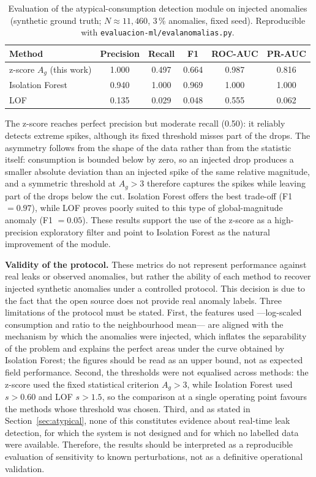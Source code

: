 \documentclass[runningheads]{llncs}
\renewcommand{\_}{\origunderscore\allowbreak}
\newif\ifshowchanges
\newcommand{\new}[1]{\ifshowchanges\textcolor{chg}{#1}\else#1\fi}
\begin{document}
\begin{table}[tbp]
\centering
\caption{Evaluation of the atypical-consumption detection module on injected
anomalies (synthetic ground truth; $N\approx11{,}460$, 3\,\% anomalies, fixed
seed). Reproducible with \texttt{evaluacion-ml/eval\_anomalias.py}.}
\label{tab:eval_ml}
\footnotesize
\begin{tabular}{@{}lccccc@{}}
\toprule
\textbf{Method} & \textbf{Precision} & \textbf{Recall} & \textbf{F1} & \textbf{ROC-AUC} & \textbf{PR-AUC} \\
\midrule
z-score $A_g$ (this work) & 1.000 & 0.497 & 0.664 & 0.987 & 0.816 \\
Isolation Forest          & 0.940 & 1.000 & 0.969 & 1.000 & 1.000 \\
LOF                       & 0.135 & 0.029 & 0.048 & 0.555 & 0.062 \\
\bottomrule
\end{tabular}
\end{table}

The z-score reaches perfect precision but moderate recall (0.50): it reliably
detects extreme spikes, although its fixed threshold misses part of the drops.
\new{The asymmetry follows from the shape of the data rather than from the
statistic itself: consumption is bounded below by zero, so an injected drop
produces a smaller absolute deviation than an injected spike of the same relative
magnitude, and a symmetric threshold at $A_g>3$ therefore captures the spikes
while leaving part of the drops below the cut.} Isolation Forest offers the best
trade-off (F1 $=0.97$), while LOF proves poorly suited to this type of
global-magnitude anomaly (F1 $=0.05$). These results support the use of the
z-score as a high-precision exploratory filter and point to Isolation Forest as
the natural improvement of the module.

\textbf{Validity of the protocol.} These metrics do not represent performance
against real leaks or observed anomalies, but rather the ability of each method
to recover injected synthetic anomalies under a controlled protocol. This
decision is due to the fact that the open source does not provide real anomaly
labels. \new{Three limitations of the protocol must be stated. First, the
features used ---log-scaled consumption and ratio to the neighbourhood mean---
are aligned with the mechanism by which the anomalies were injected, which
inflates the separability of the problem and explains the perfect areas under the
curve obtained by Isolation Forest; the figures should be read as an upper bound,
not as expected field performance. Second, the thresholds were not equalised
across methods: the z-score used the fixed statistical criterion $A_g>3$, while
Isolation Forest used $s>0.60$ and LOF $s>1.5$, so the comparison at a single
operating point favours the methods whose threshold was chosen. Third, and as
stated in Section~\ref{sec:atypical}, none of this constitutes evidence about
real-time leak detection, for which the system is not designed and for which no
labelled data were available.} Therefore, the results should be interpreted as a
reproducible evaluation of sensitivity to known perturbations, not as a
definitive operational validation.
\end{document}
